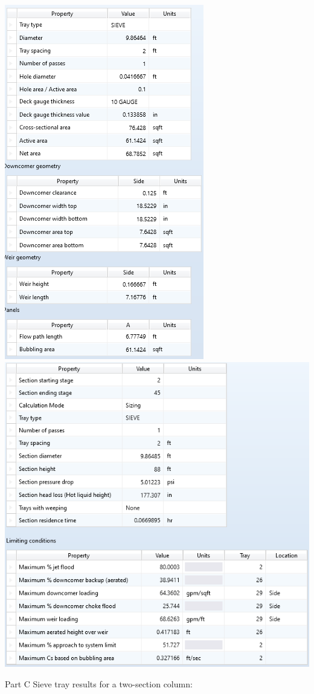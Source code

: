 \documentclass[12pt]{article}
\begin{document}
\begin{center}
    \includegraphics{sieve 1 geometry.png}
    \includegraphics[scale=0.9]{sieve 1 results.png}
\end{center}
Part C Sieve tray results for a two-section column:
\end{document}

